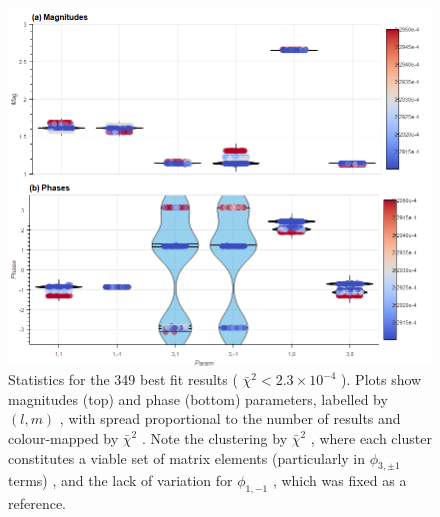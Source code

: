 \documentclass[10pt]{article}
\begin{document}
\begin{figure}[]
\begin{center}
\includegraphics[width=\textwidth,height=\dimexpr\textheight-4\baselineskip-\abovecaptionskip-\belowcaptionskip\relax,keepaspectratio]{figures/dataDump_1000fitTests_multiFit_noise_051021_paramsViolin_290722_11-11-15.png}
\caption{Statistics for the 349 best fit results ( \(\bar{\chi}^2 < 2.3 \times 10^{-4}\) ). Plots show magnitudes (top) and phase (bottom) parameters, labelled by \((l,m)\) , with spread proportional to the number of results and colour-mapped by \(\bar{\chi}^2\) . Note the clustering by \(\bar{\chi}^2\) , where each cluster constitutes a viable set of matrix elements (particularly in \(\phi_{3,\pm1}\) terms) , and the lack of variation for \(\phi_{1,-1}\) , which was fixed as a reference.\label{494229}}
\end{center}
\end{figure}
\end{document}
